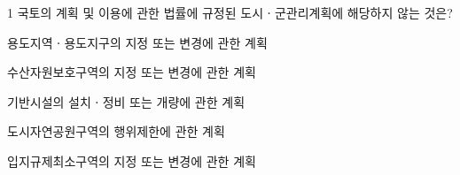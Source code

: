 \begin{question}{1}
국토의 계획 및 이용에 관한 법률에 규정된 도시ㆍ군관리계획에 해당하지 않는 것은?
\begin{choices}
  \item 용도지역ㆍ용도지구의 지정 또는 변경에 관한 계획
  \item 수산자원보호구역의 지정 또는 변경에 관한 계획
  \item 기반시설의 설치ㆍ정비 또는 개량에 관한 계획
  \item 도시자연공원구역의 행위제한에 관한 계획
  \item 입지규제최소구역의 지정 또는 변경에 관한 계획
\end{choices}
\end{question}
